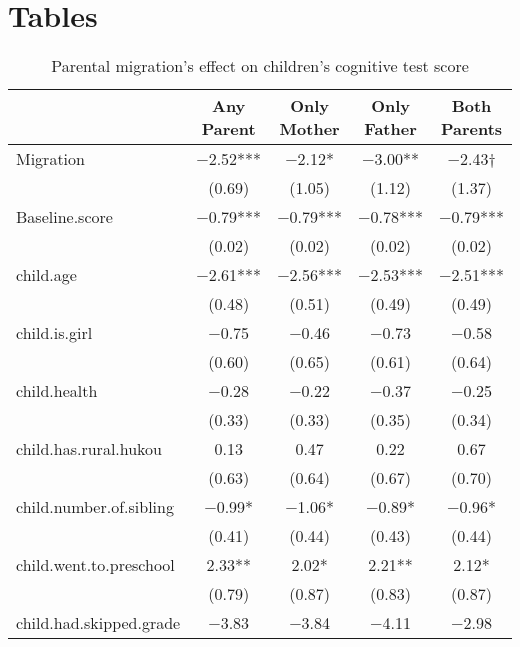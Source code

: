 \documentclass[
  man,floatsintext]{apa7}
\begin{document}
\newpage

\hypertarget{appendix-the-appendix}{%
\appendix}


\hypertarget{tables}{%
\section{Tables}\label{tables}}

\begin{table}

\caption{Parental migration’s effect on children’s cognitive test score}
\centering
\begin{tabular}[t]{lcccc}
\toprule
  & Any Parent & Only Mother & Only Father & Both Parents\\
\midrule
Migration & \num{-2.52}*** & \num{-2.12}* & \num{-3.00}** & \num{-2.43}†\\
 & (\num{0.69}) & (\num{1.05}) & (\num{1.12}) & (\num{1.37})\\
Baseline.score & \num{-0.79}*** & \num{-0.79}*** & \num{-0.78}*** & \num{-0.79}***\\
 & (\num{0.02}) & (\num{0.02}) & (\num{0.02}) & (\num{0.02})\\
child.age & \num{-2.61}*** & \num{-2.56}*** & \num{-2.53}*** & \num{-2.51}***\\
 & (\num{0.48}) & (\num{0.51}) & (\num{0.49}) & (\num{0.49})\\
child.is.girl & \num{-0.75} & \num{-0.46} & \num{-0.73} & \num{-0.58}\\
 & (\num{0.60}) & (\num{0.65}) & (\num{0.61}) & (\num{0.64})\\
child.health & \num{-0.28} & \num{-0.22} & \num{-0.37} & \num{-0.25}\\
 & (\num{0.33}) & (\num{0.33}) & (\num{0.35}) & (\num{0.34})\\
child.has.rural.hukou & \num{0.13} & \num{0.47} & \num{0.22} & \num{0.67}\\
 & (\num{0.63}) & (\num{0.64}) & (\num{0.67}) & (\num{0.70})\\
child.number.of.sibling & \num{-0.99}* & \num{-1.06}* & \num{-0.89}* & \num{-0.96}*\\
 & (\num{0.41}) & (\num{0.44}) & (\num{0.43}) & (\num{0.44})\\
child.went.to.preschool & \num{2.33}** & \num{2.02}* & \num{2.21}** & \num{2.12}*\\
 & (\num{0.79}) & (\num{0.87}) & (\num{0.83}) & (\num{0.87})\\
child.had.skipped.grade & \num{-3.83} & \num{-3.84} & \num{-4.11} & \num{-2.98}\\

\end{tabular}
\end{table}
\end{document}
